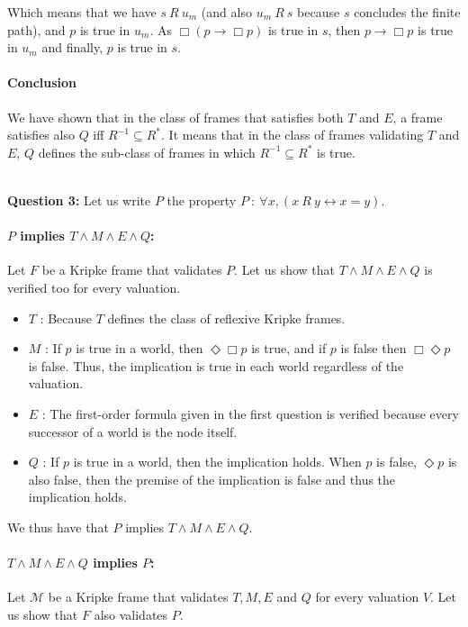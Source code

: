 \documentclass[10pt]{article}
\def\question#1{\ \vspace{1cm}\\\textbf{Question #1:}\quad}
\def\M{\mathcal{M}}
\begin{document}
Which means that we have $s\ R\ u_m$ (and also $u_m\ R\ s$ because $s$ concludes the finite path), and $p$ is true in $u_m$. As $\Box(p\rightarrow\Box p)$ is true in $s$, then $p\rightarrow\Box p$ is true in $u_m$ and finally, $p$ is true in $s$.

\paragraph{Conclusion}
We have shown that in the class of frames that satisfies both $T$ and $E$, a frame satisfies also $Q$ iff $R^{-1}\subseteq R^*$. It means that in the class of frames validating $T$ and $E$, $Q$ defines the sub-class of frames in which $R^{-1}\subseteq R^*$ is true.

\question{3}
Let us write $P$ the property $P\ :\ \forall x,(x\ R\ y\leftrightarrow x=y)$.

\paragraph{$P$ implies $T\wedge M\wedge E\wedge Q$:}
Let $F$ be a Kripke frame that validates $P$. Let us show that $T\wedge M\wedge E\wedge Q$ is verified too for every valuation.
\begin{itemize}
\item $T$ : Because $T$ defines the class of reflexive Kripke frames.
\item $M$ : If $p$ is true in a world, then $\Diamond\Box p$ is true, and if $p$ is false then $\Box\Diamond p$ is false. Thus, the implication is true in each world regardless of the valuation.
\item $E$ : The first-order formula given in the first question is verified because every successor of a world is the node itself.
\item $Q$ : If $p$ is true in a world, then the implication holds. When $p$ is false, $\Diamond p$ is also false, then the premise of the implication is false and thus the implication holds.
\end{itemize}

We thus have that $P$ implies $T\wedge M\wedge E\wedge Q$.

\paragraph{$T\wedge M\wedge E\wedge Q$ implies $P$:}

Let $\M$ be a Kripke frame that validates $T,M,E$ and $Q$ for every valuation $V$. Let us show that $F$ also validates $P$.
\end{document}

